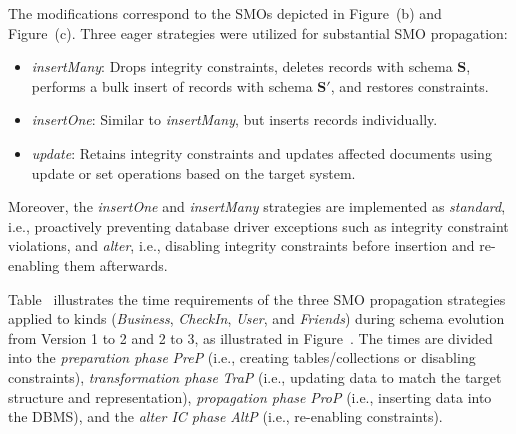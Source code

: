 The modifications correspond to the SMOs depicted in Figure~(b) and Figure~(c). Three eager strategies were utilized for substantial SMO propagation:
\begin{itemize}
    \item \textit{insertMany}: Drops integrity constraints, deletes records with schema $\mathbf{S}$, performs a bulk insert of records with schema $\mathbf{S}'$, and restores constraints.
    \item \textit{insertOne}: Similar to \textit{insertMany}, but inserts records individually.
    \item \textit{update}: Retains integrity constraints and updates affected documents using update or set operations based on the target system.
\end{itemize}

Moreover, the \textit{insertOne} and \textit{insertMany} strategies are implemented as \textit{standard}, i.e., proactively preventing database driver exceptions such as integrity constraint violations, and \textit{alter}, i.e., disabling integrity constraints before insertion and re-enabling them afterwards.

Table~ illustrates the time requirements of the three SMO propagation strategies applied to kinds (\textit{Business}, \textit{CheckIn}, \textit{User}, and \textit{Friends}) during schema evolution from Version 1 to 2 and 2 to 3, as illustrated in Figure~. The times are divided into the \textit{preparation phase} \textit{PreP} (i.e., creating tables/collections or disabling constraints), \textit{transformation phase} \textit{TraP} (i.e., updating data to match the target structure and representation), \textit{propagation phase} \textit{ProP} (i.e., inserting data into the DBMS), and the \textit{alter IC phase} \textit{AltP} (i.e., re-enabling constraints).

